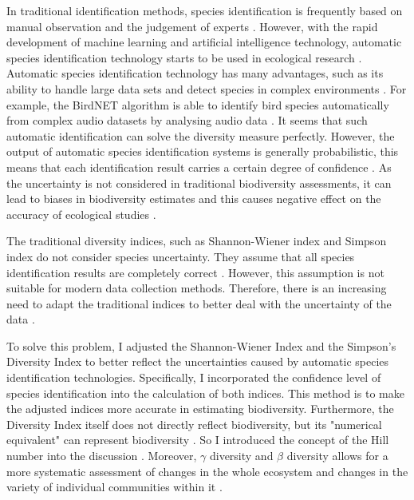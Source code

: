 \documentclass[a4paper,12pt]{article}
\begin{document}
In traditional identification methods, species identification is frequently based on manual observation and the judgement of experts \citep{dayrat2005towards}. However, with the rapid development of machine learning and artificial intelligence technology, automatic species identification technology starts to be used in ecological research \citep{mac2018bat}. Automatic species identification technology has many advantages, such as its ability to handle large data sets and detect species in complex environments \citep{christin2019applications}. For example, the BirdNET algorithm is able to identify bird species automatically from complex audio datasets by analysing audio data \citep{kahl2021birdnet}. It seems that such automatic identification can solve the diversity measure perfectly. However, the output of automatic species identification systems is generally probabilistic, this means that each identification result carries a certain degree of confidence \citep{perez2023birdnet}. As the uncertainty is not considered in traditional biodiversity assessments, it can lead to biases in biodiversity estimates and this causes negative effect on the accuracy of ecological studies \citep{thuiller2019uncertainty,rowland2021guide}.

The traditional diversity indices, such as Shannon-Wiener index and Simpson index do not consider species uncertainty. They assume that all species identification results are completely correct \citep{jost2006entropy}. However, this assumption is not suitable for modern data collection methods. Therefore, there is an increasing need to adapt the traditional indices to better deal with the uncertainty of the data \citep{leung2024global,chao2016nonparametric,norouzzadeh2018automatically}.

To solve this problem, I adjusted the Shannon-Wiener Index and the Simpson's Diversity Index to better reflect the uncertainties caused by automatic species identification technologies. Specifically, I incorporated the confidence level of species identification into the calculation of both indices. This method is to make the adjusted indices more accurate in estimating biodiversity. Furthermore, the Diversity Index itself does not directly reflect biodiversity, but its "numerical equivalent" can represent biodiversity \citep{jost2006entropy}. So I introduced the concept of the Hill number into the discussion \citep{hill1973diversity}. Moreover, $\gamma$ diversity and $\beta$ diversity allows for a more systematic assessment of changes in the whole ecosystem and changes in the variety of individual communities within it \citep{jost2010independence}.
\end{document}
